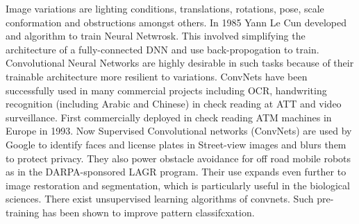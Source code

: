 Image variations are lighting conditions, translations, rotations, pose, scale conformation and obstructions amongst others\citep{liu2014deep}.
In 1985 Yann Le Cun developed and algorithm to train Neural Netwrosk.
This involved simplifying the architecture of a fully-connected DNN and use back-propogation to train\citep{bengio2009advances}.
Convolutional Neural Networks are highly desirable in such tasks because of their trainable architecture more resilient to variations\citep{lecun2010convolutional}.
ConvNets have been successfully used in many commercial projects including OCR, handwriting recognition (including Arabic and Chinese) in check reading at ATT and video surveillance\citep{bengio2009advances}.
First commercially deployed in check reading ATM machines in Europe in 1993\citep{bengio2009advances}.
Now Supervised Convolutional networks (ConvNets) are used by Google  to identify faces and license plates in Street-view images and blurs them to protect privacy\citep{bengio2009advances}.
They also power obstacle avoidance for off road mobile robots as in the DARPA-sponsored LAGR program\citep{bengio2009advances}.
Their use expands even further to image restoration and segmentation, which is particularly useful in the biological sciences.
There exist unsupervised learning algorithms of convnets\citep{goyal2014object}. 
Such pre-training has been shown to improve pattern classifcxation\citep{ciresan2012multi}.

